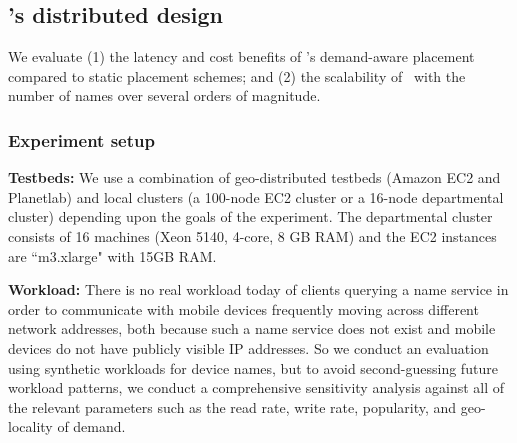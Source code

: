 


\vspace{-0.1in}
\subsection{\auspice's distributed design}
We evaluate (1) the latency and cost benefits of \auspice's demand-aware placement compared to static placement schemes; and (2) the scalability of \auspice\ with the number of names over several orders of magnitude.
\subsubsection{Experiment setup}

\textbf{Testbeds:} We use a combination of geo-distributed testbeds (Amazon EC2 and Planetlab) and local clusters (a 100-node EC2 cluster or a 16-node departmental cluster) depending upon the goals of the experiment. The departmental cluster consists of 16 machines  (Xeon 5140, 4-core, 8 GB RAM)  and the EC2 instances are ``m3.xlarge" with 15GB RAM.


\textbf{Workload:} There is no real workload today of clients querying a name service in order to communicate with mobile devices frequently moving across different network addresses, both because such a name service does not exist and mobile devices do not have publicly visible IP addresses. So we conduct an evaluation using synthetic workloads for device names, but to avoid second-guessing future workload patterns, we conduct a comprehensive sensitivity analysis against all of the relevant parameters such as the read rate, write rate, popularity, and geo-locality of demand.

